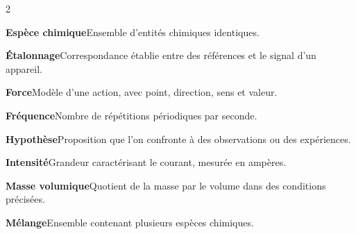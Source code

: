 \begin{multicols}{2}
\par\addvspace{2mm}\noindent\begin{minipage}{\linewidth}\textbf{Espèce chimique}\enspace Ensemble d’entités chimiques identiques.\par\end{minipage}\par
\par\addvspace{2mm}\noindent\begin{minipage}{\linewidth}\textbf{Étalonnage}\enspace Correspondance établie entre des références et le signal d’un appareil.\par\end{minipage}\par
\par\addvspace{2mm}\noindent\begin{minipage}{\linewidth}\textbf{Force}\enspace Modèle d’une action, avec point, direction, sens et valeur.\par\end{minipage}\par
\par\addvspace{2mm}\noindent\begin{minipage}{\linewidth}\textbf{Fréquence}\enspace Nombre de répétitions périodiques par seconde.\par\end{minipage}\par
\par\addvspace{2mm}\noindent\begin{minipage}{\linewidth}\textbf{Hypothèse}\enspace Proposition que l’on confronte à des observations ou des expériences.\par\end{minipage}\par
\par\addvspace{2mm}\noindent\begin{minipage}{\linewidth}\textbf{Intensité}\enspace Grandeur caractérisant le courant, mesurée en ampères.\par\end{minipage}\par
\par\addvspace{2mm}\noindent\begin{minipage}{\linewidth}\textbf{Masse volumique}\enspace Quotient de la masse par le volume dans des conditions précisées.\par\end{minipage}\par
\par\addvspace{2mm}\noindent\begin{minipage}{\linewidth}\textbf{Mélange}\enspace Ensemble contenant plusieurs espèces chimiques.\par\end{minipage}\par

\end{multicols}
